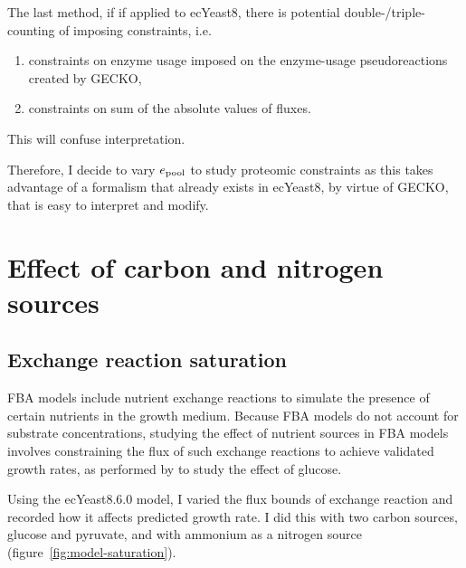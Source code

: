 The last method, if if applied to ecYeast8,
there is potential double-/triple-counting of imposing constraints, i.e.\:
\begin{enumerate}
  \item constraints on enzyme usage imposed on the enzyme-usage pseudoreactions created by GECKO,
  \item constraints on sum of the absolute values of fluxes.
\end{enumerate}
This will confuse interpretation.

Therefore, I decide to vary $e_{\mathrm{pool}}$ to study proteomic constraints as this takes advantage of a formalism that already exists in ecYeast8, by virtue of GECKO, that is easy to interpret and modify.


\section{Effect of carbon and nitrogen sources}
\label{sec:model-exchange}

\subsection{Exchange reaction saturation}
\label{subsec:model-saturation}

FBA models include nutrient exchange reactions to simulate the presence of certain nutrients in the growth medium.
Because FBA models do not account for substrate concentrations, studying the effect of nutrient sources in FBA models involves constraining the flux of such exchange reactions to achieve validated growth rates, as performed by \textcite{elsemmanWholecellModelingYeast2022} to study the effect of glucose.

Using the ecYeast8.6.0 model, I varied the flux bounds of exchange reaction and recorded how it affects predicted growth rate.
I did this with two carbon sources, glucose and pyruvate, and with ammonium as a nitrogen source (figure~\ref{fig:model-saturation}).

